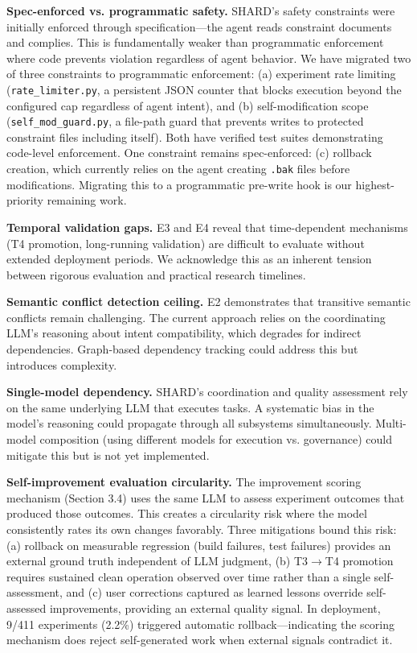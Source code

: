 \documentclass[11pt]{article}
\begin{document}
\textbf{Spec-enforced vs. programmatic safety.} SHARD's safety constraints were initially enforced through specification---the agent reads constraint documents and complies. This is fundamentally weaker than programmatic enforcement where code prevents violation regardless of agent behavior. We have migrated two of three constraints to programmatic enforcement: (a) experiment rate limiting (\texttt{rate\_limiter.py}, a persistent JSON counter that blocks execution beyond the configured cap regardless of agent intent), and (b) self-modification scope (\texttt{self\_mod\_guard.py}, a file-path guard that prevents writes to protected constraint files including itself). Both have verified test suites demonstrating code-level enforcement. One constraint remains spec-enforced: (c) rollback creation, which currently relies on the agent creating \texttt{.bak} files before modifications. Migrating this to a programmatic pre-write hook is our highest-priority remaining work.

\textbf{Temporal validation gaps.} E3 and E4 reveal that time-dependent mechanisms (T4 promotion, long-running validation) are difficult to evaluate without extended deployment periods. We acknowledge this as an inherent tension between rigorous evaluation and practical research timelines.

\textbf{Semantic conflict detection ceiling.} E2 demonstrates that transitive semantic conflicts remain challenging. The current approach relies on the coordinating LLM's reasoning about intent compatibility, which degrades for indirect dependencies. Graph-based dependency tracking could address this but introduces complexity.

\textbf{Single-model dependency.} SHARD's coordination and quality assessment rely on the same underlying LLM that executes tasks. A systematic bias in the model's reasoning could propagate through all subsystems simultaneously. Multi-model composition (using different models for execution vs. governance) could mitigate this but is not yet implemented.

\textbf{Self-improvement evaluation circularity.} The improvement scoring mechanism (Section 3.4) uses the same LLM to assess experiment outcomes that produced those outcomes. This creates a circularity risk where the model consistently rates its own changes favorably. Three mitigations bound this risk: (a) rollback on measurable regression (build failures, test failures) provides an external ground truth independent of LLM judgment, (b) T3$\rightarrow$T4 promotion requires sustained clean operation observed over time rather than a single self-assessment, and (c) user corrections captured as learned lessons override self-assessed improvements, providing an external quality signal. In deployment, 9/411 experiments (2.2\%) triggered automatic rollback---indicating the scoring mechanism does reject self-generated work when external signals contradict it.
\end{document}
